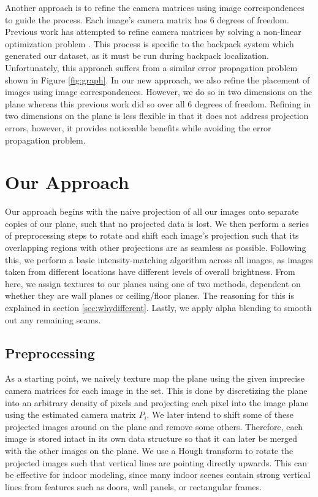 \documentclass[10pt,twocolumn,letterpaper]{article}
\begin{document}
Another approach is to refine the camera matrices using image
correspondences to guide the process. Each image's camera matrix has 6 degrees of freedom. Previous work has attempted to refine
camera matrices by solving a non-linear optimization problem
\cite{liu2010indoor}. This process is specific to the backpack system
which generated our dataset, as it must be run during backpack
localization\cite{liu2010indoor,chen2010indoor}. Unfortunately, this
approach suffers from a similar error propagation problem shown in
Figure \ref{fig:graph}. In our new approach, we also refine the
placement of images using image correspondences. However, we do so in
two dimensions on the plane whereas this previous work did so over all
6 degrees of freedom. Refining in two dimensions on the plane is less
flexible in that it does not address projection errors, however, it
provides noticeable benefits while avoiding the error propagation
problem.


\section{Our Approach}
Our approach begins with the naive projection of all our images onto separate copies of our plane, such that no projected data is lost. We then perform a series of preprocessing steps to rotate and shift each image's projection such that its overlapping regions with other projections are as seamless as possible. Following this, we perform a basic intensity-matching algorithm across all images, as images taken from different locations have different levels of overall brightness. From here, we assign textures to our planes using one of two methods, dependent on whether they are wall planes or ceiling/floor planes. The reasoning for this is explained in section \ref{sec:whydifferent}. Lastly, we apply alpha blending to smooth out any remaining seams.

\subsection{Preprocessing}
As a starting point, we naively texture map the plane using the given imprecise camera matrices for each image in the set. This is done by discretizing the plane into an arbitrary density of pixels and projecting each pixel into the image plane using the estimated camera matrix $P_i$. We later intend to shift some of these projected images around on the plane and remove some others. Therefore, each image is stored intact in its own data structure so that it can later be merged with the other images on the plane. We use a Hough transform to rotate the projected images such that vertical lines are pointing directly upwards. This can be effective for indoor modeling, since many indoor scenes contain strong vertical lines from features such as doors, wall panels, or rectangular frames. 
\end{document}
